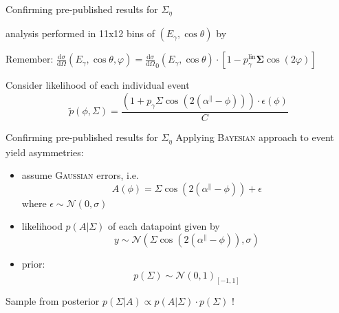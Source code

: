 \documentclass[11pt,aspectratio=169,dvipsnames]{beamer}
\newcommand{\thecolor}{black!70!blue}
\begin{document}
	\begin{frame}[noframenumbering]{Confirming pre-published results for $\Sigma_\eta$}
	
	\begin{minipage}{\linewidth}
		\begin{tcolorbox}[colback=blue!5,colframe=\thecolor,title={Event selection ($\eta$)}]
			analysis performed in 11x12 bins of $(E_\gamma,\cos\theta)$ by {\cites{eta}}
		\end{tcolorbox}
	\end{minipage}
	\begin{minipage}{\linewidth}
		\begin{tcolorbox}[colback=blue!5,colframe=\thecolor,title={Methods}]
			\begin{center}
				Remember: $\frac{\text{d}\sigma}{\text{d}\Omega}(E_\gamma,\cos\theta,\varphi)=\frac{\text{d}\sigma}{\text{d}\Omega}_0(E_\gamma,\cos\theta)\cdot\left[1-p_\gamma^{\text{lin}}\boldsymbol{\Sigma}\cos(2\varphi)\right]$
			\end{center}
			
			
			\begin{tcolorbox}[colback=blue!5,colframe=\thecolor,title={Unbinned maximum likelihood fit}]
				Consider likelihood of each individual event
				\begin{equation*}
					\tilde{p}(\phi,\Sigma)=\frac{\left(1+p_\gamma\Sigma\cos\left(2\left(\alpha^\parallel-\phi\right)\right)\right)\cdot\epsilon\left(\phi\right)}{C}
				\end{equation*}
			\end{tcolorbox}		
			
		\end{tcolorbox}
	\end{minipage}
\end{frame}
	\begin{frame}{Confirming pre-published results for $\Sigma_\eta$}
		Applying \textsc{Bayesian} approach to event yield asymmetries:
		\begin{itemize}
			\item assume \textsc{Gaussian} errors, i.e.
			$$A(\phi)=\Sigma\cos\left(2\left(\alpha^\parallel-\phi\right)\right)+\epsilon$$ where $\epsilon\sim\mathcal{N}(0,\sigma)$
			\item likelihood $p(A|\Sigma)$ of each datapoint given by $$y\sim\mathcal{N}\left(\Sigma\cos\left(2\left(\alpha^\parallel-\phi\right)\right),\sigma\right)$$
			\item prior: $$p(\Sigma)\sim\mathcal{N}(0,1)_{[-1,1]}$$
		\end{itemize}
	Sample from posterior $p(\Sigma|A)\propto p(A|\Sigma)\cdot p(\Sigma)$ !
	\end{frame}
\end{document}
